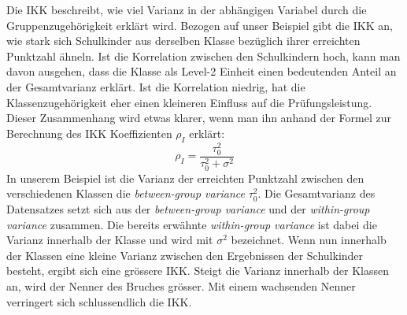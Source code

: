 \documentclass[12pt]{article}\usepackage[]{graphicx}\usepackage[]{color}
\begin{document}
Die IKK beschreibt, wie viel Varianz in der abhängigen Variabel durch die Gruppenzugehörigkeit erklärt wird. Bezogen auf unser Beispiel gibt die IKK an, wie stark sich Schulkinder aus derselben Klasse bezüglich ihrer erreichten Punktzahl ähneln. Ist die Korrelation zwischen den Schulkindern hoch, kann man davon ausgehen, dass die Klasse als Level-2 Einheit einen bedeutenden Anteil an der Gesamtvarianz erklärt. Ist die Korrelation niedrig, hat die Klassenzugehörigkeit eher einen kleineren Einfluss auf die Prüfungsleistung. Dieser Zusammenhang wird etwas klarer, wenn man ihn anhand der Formel zur Berechnung des IKK Koeffizienten $\rho_{I}$ erklärt:
\begin{equation} \label{eq:icc}
\rho_{I} = \dfrac{\tau_{0}^{2}}{\tau_{0}^{2} + \sigma^{2}}
\end{equation} 
In unserem Beispiel ist die Varianz der erreichten Punktzahl zwischen den verschiedenen Klassen die \textit{between-group variance} $\tau_{0}^2$. Die Gesamtvarianz des Datensatzes setzt sich aus der \textit{between-group variance} und der \textit{within-group variance} zusammen. Die bereits erwähnte \textit{within-group variance} ist dabei die Varianz innerhalb der Klasse und wird mit $\sigma^2$ bezeichnet. Wenn nun innerhalb der Klassen eine kleine Varianz zwischen den Ergebnissen der Schulkinder besteht, ergibt sich eine grössere IKK. Steigt die Varianz innerhalb der Klassen an, wird der Nenner des Bruches grösser. Mit einem wachsenden Nenner verringert sich schlussendlich die IKK.
\end{document}
